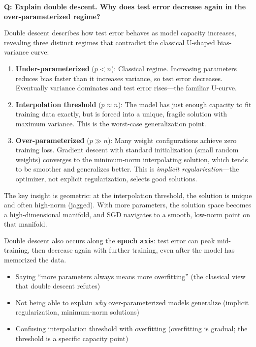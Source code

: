 \begin{interviewq}
\textbf{Q: Explain double descent. Why does test error decrease again in the over-parameterized regime?}

 \quad {} \quad \badgefreq{\freqhigh}

\stronganswer
Double descent describes how test error behaves as model capacity increases, revealing three distinct regimes that contradict the classical U-shaped bias-variance curve:

\begin{enumerate}
    \item \textbf{Under-parameterized} ($p < n$): Classical regime. Increasing parameters reduces bias faster than it increases variance, so test error decreases. Eventually variance dominates and test error rises---the familiar U-curve.
    \item \textbf{Interpolation threshold} ($p \approx n$): The model has just enough capacity to fit training data exactly, but is forced into a unique, fragile solution with maximum variance. This is the worst-case generalization point.
    \item \textbf{Over-parameterized} ($p \gg n$): Many weight configurations achieve zero training loss. Gradient descent with standard initialization (small random weights) converges to the minimum-norm interpolating solution, which tends to be smoother and generalizes better. This is \textit{implicit regularization}---the optimizer, not explicit regularization, selects good solutions.
\end{enumerate}

The key insight is geometric: at the interpolation threshold, the solution is unique and often high-norm (jagged). With more parameters, the solution space becomes a high-dimensional manifold, and SGD navigates to a smooth, low-norm point on that manifold.

Double descent also occurs along the \textbf{epoch axis}: test error can peak mid-training, then decrease again with further training, even after the model has memorized the data.

\redflags
\begin{itemize}
    \item Saying ``more parameters always means more overfitting'' (the classical view that double descent refutes)
    \item Not being able to explain \textit{why} over-parameterized models generalize (implicit regularization, minimum-norm solutions)
    \item Confusing interpolation threshold with overfitting (overfitting is gradual; the threshold is a specific capacity point)
\end{itemize}


\end{interviewq}
